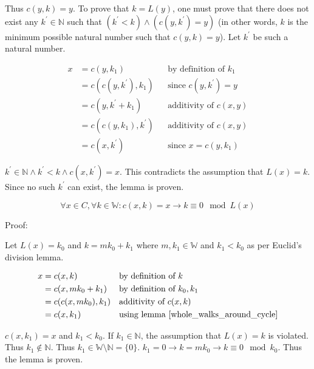 \documentclass[11pt]{article}
\begin{document}
    Thus $c(y,k)=y$. To prove that $k=L(y)$, one must prove that there does not exist any $k^{'} \in \mathbb{N}$ such that $(k^{'}<k) \land (c(y,k^{'})=y)$ (in other words, $k$ is the minimum possible natural number such that $c(y,k)=y$). Let $k^{'}$ be such a natural number.

    \begin{align*}
        \text{$x$} &= \text{$c(y,k_{1})$} && \text{by definition of $k_{1}$} \\
        &= \text{$c(c(y,k^{'}),k_{1})$} && \text{since $c(y,k^{'})=y$} \\
        &= \text{$c(y,k^{'}+k_{1})$} && \text{additivity of $c(x,y)$} \\
        &= \text{$c(c(y,k_{1}),k^{'})$} && \text{additivity of $c(x,y)$} \\
        &= \text{$c(x,k^{'})$} && \text{since $x=c(y,k_{1})$}
    \end{align*}

    $k^{'} \in \mathbb{N} \land k^{'}<k \land c(x,k^{'})=x$. This contradicts the assumption that $L(x)=k$. Since no such $k^{'}$ can exist, the lemma is proven.

    \begin{equation}
        \forall x \in C, \forall k \in \mathbb{W}: c(x,k)=x \rightarrow k \equiv 0 \mod L(x)
        \label{start_is_end_implies_whole_length}
    \end{equation}

    Proof:

    Let $L(x)=k_{0}$ and $k=mk_{0}+k_{1}$ where $m,k_{1} \in \mathbb{W}$ and $k_{1}<k_{0}$ as per Euclid's division lemma.

    \begin{align*}
        \text{$x$} &= \text{$c(x,k)$} && \text{by definition of $k$} \\
        &= \text{$c(x,mk_{0}+k_{1})$} && \text{by definition of $k_{0},k_{1}$} \\
        &= \text{$c(c(x,mk_{0}),k_{1})$} && \text{additivity of $c(x,k)$} \\
        &= \text{$c(x,k_{1})$} && \text{using lemma \ref{whole_walks_around_cycle}}
    \end{align*}

    $c(x,k_{1})=x$ and $k_{1}<k_{0}$. If $k_{1} \in \mathbb{N}$, the assumption that $L(x)=k$ is violated. Thus $k_{1} \notin \mathbb{N}$. Thus $k_{1} \in \mathbb{W} \setminus \mathbb{N} = \{0\}$. $k_{1}=0 \rightarrow k=mk_{0} \rightarrow k \equiv 0 \mod k_{0}$. Thus the lemma is proven.
\end{document}
